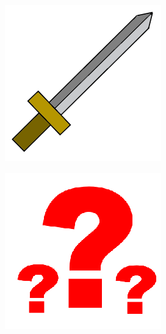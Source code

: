 \documentclass{sigchi-ext}
\begin{document}
\begin{figure}
	\centering
	\begin{minipage}{.5\columnwidth}
		\centering
		\includegraphics[width=1\linewidth]{figures/Class_Fighter}
		\label{fig:Class_Fighter}
	\end{minipage}%
	\begin{minipage}{.5\columnwidth}
		\centering
		\includegraphics[width=1\linewidth]{figures/Class_Puzzlemaster}
		\label{fig:Class_Fighter}
	\end{minipage}
\end{figure}
\end{document}
